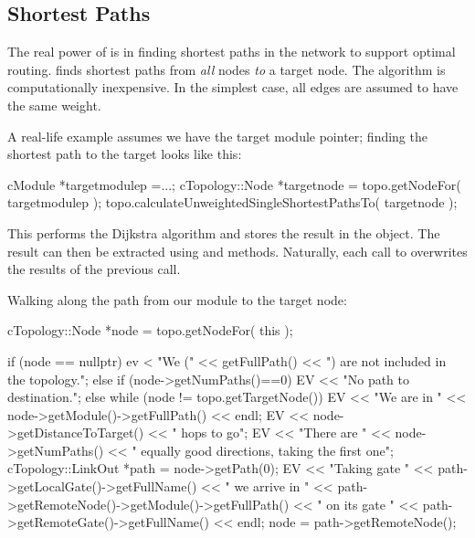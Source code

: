 \subsection{Shortest Paths}

The real power of  is in finding shortest
paths in the network to support optimal
routing.  finds shortest paths
from \textit{all} nodes \textit{to} a target node. The algorithm is
computationally inexpensive. In the simplest case, all edges are
assumed to have the same weight.

A real-life example assumes we have the target module pointer; finding
the shortest path to the target looks like this:

\begin{cpp}
cModule *targetmodulep =...;
cTopology::Node *targetnode = topo.getNodeFor( targetmodulep );
topo.calculateUnweightedSingleShortestPathsTo( targetnode );
\end{cpp}


This performs the Dijkstra algorithm and
stores the result in the  object. The result can
then be extracted using  and
 methods.  Naturally, each call to
 overwrites the results of
the previous call.

Walking along the path from our module to the target node:

\begin{cpp}
cTopology::Node *node = topo.getNodeFor( this );

if (node == nullptr) {
  ev < "We (" << getFullPath() << ") are not included in the topology.\n";
}
else if (node->getNumPaths()==0) {
  EV << "No path to destination.\n";
}
else {
  while (node != topo.getTargetNode()) {
    EV << "We are in " << node->getModule()->getFullPath() << endl;
    EV << node->getDistanceToTarget() << " hops to go\n";
    EV << "There are " << node->getNumPaths()
       << " equally good directions, taking the first one\n";
    cTopology::LinkOut *path = node->getPath(0);
    EV << "Taking gate " << path->getLocalGate()->getFullName()
       << " we arrive in " << path->getRemoteNode()->getModule()->getFullPath()
       << " on its gate " << path->getRemoteGate()->getFullName() << endl;
    node = path->getRemoteNode();
  }
}
\end{cpp}

